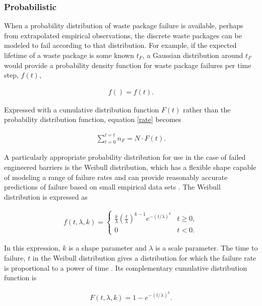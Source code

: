 \subsubsection{Probabilistic}

When a probability distribution of waste package failure is available, perhaps 
from extrapolated empirical observations, the discrete waste packages can be 
modeled to fail according to that distribution.  For example, if the expected 
lifetime of a waste package is some known $t_F$, a Gaussian distribution around 
$t_F$ would provide a probability density function for waste package failures 
per time step, $f(t)$,

\begin{align}
  f()=f(t).
  \label{probabilistic}
\end{align}

Expressed with a cumulative distribution function $F(t)$ rather than the
probability distribution function, equation \eqref{rate} becomes 


\begin{align}
  \sum_{t=0}^{t=t}n_F=N\cdot F(t).
  \label{cdf}
\end{align}


A particularly appropriate probability distribution for use in the case of failed 
engineered barriers is the Weibull distribution, which has a flexible shape 
capable of modeling a range of failure rates and can provide reasonably 
accurate predictions of failure based on small empirical data sets 
\cite{murthy_weibull_2004}. The Weibull distribution is expressed as

\begin{align}
  f(t,\lambda,k) =  \begin{cases}
    \frac{k}{\lambda}\left(\frac{t}{\lambda}\right)^{k-1}e^{-(t/\lambda)^{k}} & 
    t\geq0 ,\\
    0 & t<0 .\end{cases}
  \label{weibullpdf}
\end{align}


In this expression, $k$ is a shape parameter and $\lambda$ is a scale
parameter. The time to failure, $t$ in the Weibull distribution gives a 
distribution for which the failure rate is proportional to a power of time 
\cite{papoulis_probability_2002}. Its complementary cumulative distribution
function is 

\begin{align}
  F(t,\lambda,k) = 1-e^{-(t/\lambda)^k}.
  \label{weibullcdf}
\end{align}

